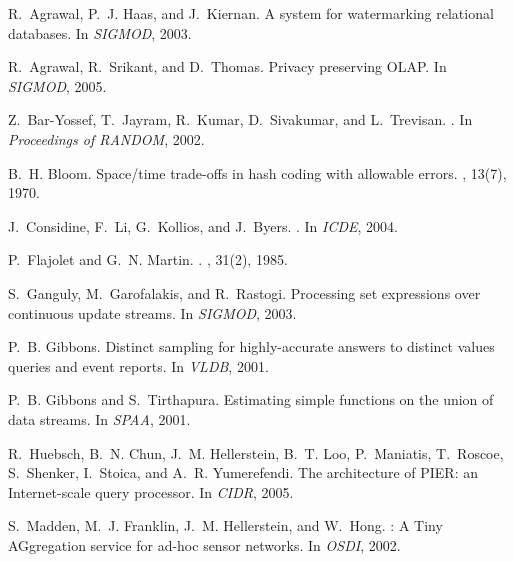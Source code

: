 \documentclass[10pt,twocolumn]{article}
\begin{document}
% 

{
\small
%

\begin{thebibliography}{}\setlength{\itemsep}{-0.5ex}\small

\vspace*{-1em}
R.~Agrawal, P.~J. Haas, and J.~Kiernan.
\newblock A system for watermarking relational databases.
\newblock In {\em SIGMOD}, 2003.

R.~Agrawal, R.~Srikant, and D.~Thomas.
\newblock Privacy preserving {OLAP}.
\newblock In {\em SIGMOD}, 2005.

Z.~Bar-Yossef, T.~Jayram, R.~Kumar, D.~Sivakumar, and L.~Trevisan.
.
\newblock In {\em Proceedings of RANDOM}, 2002.

B.~H. Bloom.
\newblock Space/time trade-offs in hash coding with allowable errors.
, 13(7), 1970.

J.~Considine, F.~Li, G.~Kollios, and J.~Byers.
.
\newblock In {\em ICDE}, 2004.

P.~Flajolet and G.~N. Martin.
.
, 31(2), 1985.

S.~Ganguly, M.~Garofalakis, and R.~Rastogi.
\newblock Processing set expressions over continuous update streams.
\newblock In {\em SIGMOD}, 2003.

P.~B. Gibbons.
\newblock Distinct sampling for highly-accurate answers to distinct values
  queries and event reports.
\newblock In {\em VLDB}, 2001.

P.~B. Gibbons and S.~Tirthapura.
\newblock Estimating simple functions on the union of data streams.
\newblock In {\em SPAA}, 2001.

R.~Huebsch, B.~N. Chun, J.~M. Hellerstein, B.~T. Loo, P.~Maniatis, T.~Roscoe,
  S.~Shenker, I.~Stoica, and A.~R. Yumerefendi.
\newblock The architecture of {PIER}: an {I}nternet-scale query processor.
\newblock In {\em CIDR}, 2005.

S.~Madden, M.~J. Franklin, J.~M. Hellerstein, and W.~Hong.
: A {T}iny {AG}gregation service for ad-hoc sensor networks.
\newblock In {\em OSDI}, 2002.


\end{thebibliography}}
\end{document}
